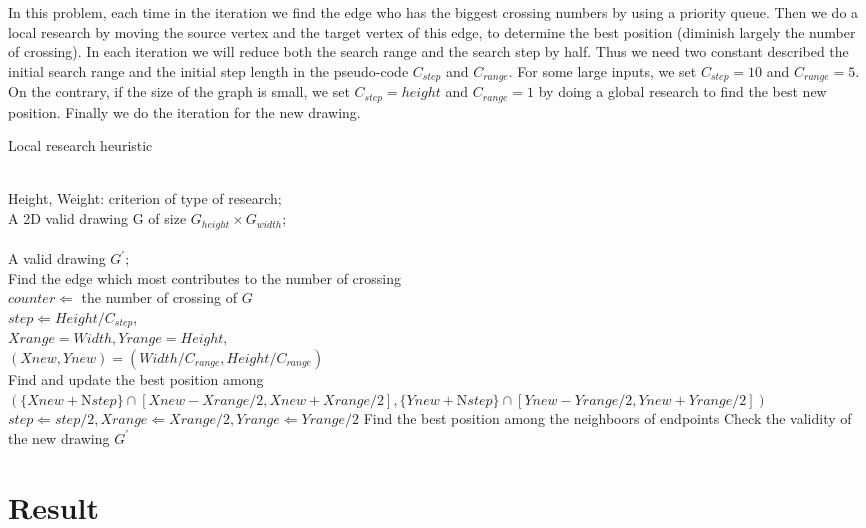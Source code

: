 \documentclass[utf8, a4paper, 12pt]{article}
\begin{document}
\indent In this problem, each time in the iteration we find the edge who has the biggest crossing numbers by using a priority queue. Then we do a local research by moving the source vertex and the target vertex of this edge, to determine the best position (diminish largely the number of crossing). In each iteration we will reduce both the search range and the search step by half. Thus we need two constant described the initial search range and the initial step length in the pseudo-code $C_{step}$ and $C_{range}$. For some large inputs, we set $C_{step} = 10$ and $C_{range}=5$. On the contrary, if the size of the graph is small, we set $C_{step}=height$ and $C_{range}=1$ by doing a global research to find the best new position. Finally we do the iteration for the new drawing.

\begin{algorithm}
\caption{Local research heuristic}
\begin{algorithmic}
\REQUIRE~~\\
\STATE Height, Weight: criterion of type of research;\\
\STATE A 2D valid drawing G of size $G_{height}\times G_{width}$;\\
\ENSURE~~\\
\STATE A valid drawing $G^\prime$;\\
\STATE Find the edge which most contributes to the number of crossing\\
\STATE $counter\Leftarrow$ the number of crossing of $G$\\
\STATE $step\Leftarrow Height/C_{step}$,\\
\STATE $Xrange=Width, Yrange=Height,$\\
\STATE$ (Xnew,Ynew)=(Width/C_{range},Height/C_{range})$\\
\STATE Find and update the best position among $(\{Xnew+\mathrm{N}step\}\cap[Xnew-Xrange/2,Xnew+Xrange/2],\{Ynew+\mathrm{N}step\}\cap[Ynew-Yrange/2,Ynew+Yrange/2])$\\
\STATE $step\Leftarrow step/2, Xrange\Leftarrow Xrange/2,
Yrange\Leftarrow Yrange/2$
\ENDWHILE
\ELSE
\STATE Find the best position among the neighboors of endpoints
\ENDIF
\STATE Check the validity of the new drawing
\RETURN $G^\prime$
\end{algorithmic}
\end{algorithm}

\newpage
\section{Result}
\end{document}
